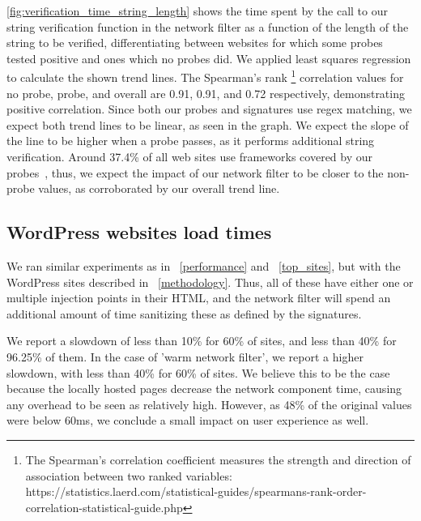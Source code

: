  \autoref{fig:verification_time_string_length} shows the time spent by the call to our string verification function in the network filter as a function of the length of the string to be verified, differentiating between websites for which some probes tested positive and ones which no probes did. We applied least squares regression to calculate the shown trend lines. The Spearman's rank \footnote{The Spearman's correlation coefficient measures the strength and direction of association between two ranked variables: https://statistics.laerd.com/statistical-guides/spearmans-rank-order-correlation-statistical-guide.php} correlation values for no probe, probe, and overall are 0.91, 0.91, and 0.72 respectively, demonstrating positive correlation. Since both our probes and signatures use regex matching, we expect both trend lines to be linear, as seen in the graph. We expect the slope of the line to be higher when a probe passes, as it performs additional string verification. Around 37.4\% of all web sites use frameworks covered by our probes~\cite{w3stats}, thus, we expect the impact of our network filter to be closer to the non-probe values, as corroborated by our overall trend line.

\subsection{WordPress websites load times} \label{wordpress_sites}

We ran similar experiments as in ~\autoref{performance} and ~\autoref{top_sites}, but with the WordPress sites described in ~\autoref{methodology}. Thus, all of these have either one or multiple injection points in their HTML, and the network filter will spend an additional amount of time sanitizing these as defined by the signatures.

We report a slowdown of less than 10\% for 60\% of sites, and less than 40\% for 96.25\% of them. In the case of 'warm network filter', we report a higher slowdown, with less than 40\% for 60\% of sites. We believe this to be the case because the locally hosted pages decrease the network component time, causing any overhead to be seen as relatively high. However, as 48\% of the original values were below 60ms, we conclude a small impact on user experience as well.


